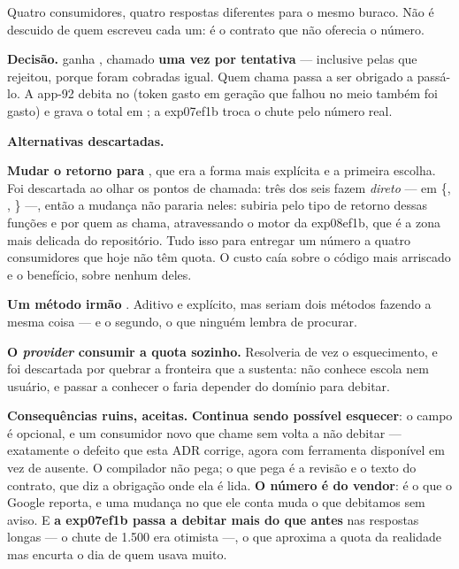 Quatro consumidores, quatro respostas diferentes para o mesmo buraco. Não é
descuido de quem escreveu cada um: é o contrato que não oferecia o número.

\textbf{Decisão.}  ganha
, chamado \textbf{uma vez por
tentativa} --- inclusive pelas que  rejeitou, porque foram cobradas
igual. Quem chama  passa a ser obrigado a passá-lo. A app-92 debita
no  (token gasto em geração que falhou no meio também foi gasto) e
grava o total em ; a exp07ef1b
troca o chute pelo número real.

\textbf{Alternativas descartadas.}

\textbf{Mudar o retorno para }, que era a forma
mais explícita e a primeira escolha. Foi descartada ao olhar os pontos de
chamada: três dos seis fazem 
\emph{direto} --- em \{,
, \} ---, então a mudança não pararia neles: subiria pelo
tipo de retorno dessas funções e por quem as chama, atravessando o motor da
exp08ef1b, que é a zona mais delicada do repositório. Tudo isso para entregar um
número a quatro consumidores que hoje não têm quota. O custo caía sobre o código
mais arriscado e o benefício, sobre nenhum deles.

\textbf{Um método irmão }. Aditivo e explícito, mas
seriam dois métodos fazendo a mesma coisa --- e o segundo, o que ninguém lembra
de procurar.

\textbf{O \emph{provider} consumir a quota sozinho.} Resolveria de vez o
esquecimento, e foi descartada por quebrar a fronteira que a 
sustenta:  não conhece escola nem usuário, e passar a conhecer o faria
depender do domínio para debitar.

\textbf{Consequências ruins, aceitas.} \textbf{Continua sendo possível
esquecer}: o campo é opcional, e um consumidor novo que chame  sem
 volta a não debitar --- exatamente o defeito que esta ADR
corrige, agora com ferramenta disponível em vez de ausente. O compilador não
pega; o que pega é a revisão e o texto do contrato, que diz a obrigação onde ela
é lida. \textbf{O número é do vendor}:  é o que
o Google reporta, e uma mudança no que ele conta muda o que debitamos sem aviso.
E \textbf{a exp07ef1b passa a debitar mais do que antes} nas respostas longas --- o
chute de 1.500 era otimista ---, o que aproxima a quota da realidade mas encurta
o dia de quem usava muito.

